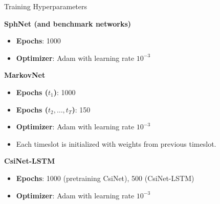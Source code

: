 \documentclass{beamer}
\begin{document}
  \begin{frame}{Training Hyperparameters}
    \footnotesize{
      \textbf{SphNet (and benchmark networks)}
      \begin{itemize}
        \item \textbf{Epochs}: 1000
        \item \textbf{Optimizer}: Adam with learning rate $10^{-3}$
      \end{itemize}
      \textbf{MarkovNet}
      \begin{itemize}
        \item \textbf{Epochs ($t_1$)}: 1000
        \item \textbf{Epochs ($t_2,\dots,t_T$)}: 150
        \item \textbf{Optimizer}: Adam with learning rate $10^{-3}$
        \item Each timeslot is initialized with weights from previous timeslot.
      \end{itemize}
      \textbf{CsiNet-LSTM}
      \begin{itemize}
        \item \textbf{Epochs}: 1000 (pretraining CsiNet), 500 (CsiNet-LSTM)
        \item \textbf{Optimizer}: Adam with learning rate $10^{-3}$
      \end{itemize}
      }
  \end{frame}

\end{document}
